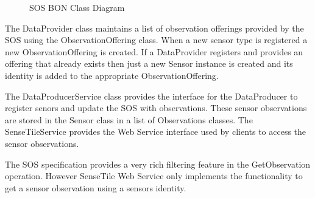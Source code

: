 \documentclass[]{final_report}
\begin{document}
 \begin{figure}[h!]
\centering
{}
\caption{SOS BON Class Diagram}\label{fig:bon_static_diagam_provider.png}
\end{figure}

The DataProvider class maintains a list of observation offerings provided by the SOS using the ObservationOffering class. When a new sensor type is registered a new ObservationOffering is created. If a DataProvider registers and provides an offering that already exists then just a new Sensor instance is created and its identity is added to the appropriate ObservationOffering.

The DataProducerService class provides the interface for the DataProducer to register senors and update the SOS with observations. These sensor observations are stored in  the Sensor class in a list of Observations classes. The SenseTileService provides the Web Service interface used by clients to access the sensor observations.

The SOS specification provides a very rich filtering feature in the GetObservation operation. However SenseTile Web Service only implements the functionality to get a sensor observation using a sensors identity.
\end{document}
